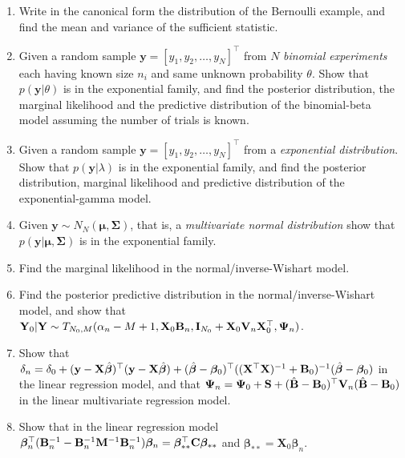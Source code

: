 \begin{enumerate}
	\item Write in the canonical form the distribution of the Bernoulli example, and find the mean and variance of the sufficient statistic.
	
	\item Given a random sample $\mathbf{y}=[y_1,y_2,\dots,y_N]^{\top}$ from $N$ \textit{binomial experiments} each having known size $n_i$ and same unknown probability $\theta$. Show that $p(\mathbf{y}|\theta)$ is in the exponential family, and find the posterior distribution, the marginal likelihood and the predictive distribution of the binomial-beta model assuming the number of trials is known.
	
	\item Given a random sample $\mathbf{y}=[y_1,y_2,\dots,y_N]^{\top}$ from a \textit{exponential distribution}. Show that $p(\mathbf{y}|\lambda)$ is in the exponential family, and find the posterior distribution, marginal likelihood and predictive distribution of the exponential-gamma model.
	
	\item Given $\mathbf{y}\sim N_N(\bm{\mu},\bm{\Sigma})$, that is, a \textit{multivariate normal distribution} show that $p(\mathbf{y}|\bm{\mu},\bm{\Sigma})$ is in the exponential family.
	
	\item Find the marginal likelihood in the normal/inverse-Wishart model.
	
	\item Find the posterior predictive distribution in the normal/inverse-Wishart model, and show that ${\bf{Y}}_0|{\bf{Y}}\sim T_{N_0,M}(\alpha_n-M+1,{\bf{X}}_0{\bf{B}}_n,{\bf{I}}_{N_0}+{\bf{X}}_0{\bf{V}}_n{\bf{X}}_0^{\top},{\bf{\Psi}}_n)$.
	
	\item Show that $\delta_n=\delta_0+({\bf{y}}-{\bf{X}}\hat{\bm{\beta}})^{\top}({\bf{y}}-{\bf{X}}\hat{\bm{\beta}})+(\hat{\bm{\beta}}-\bm{\beta}_0)^{\top}(({\bf{X}}^{\top}{\bf{X}})^{-1}+{\bf{B}}_0)^{-1}(\hat{\bm{\beta}}-\bm{\beta}_0)$ in the linear regression model, and that ${\bf{\Psi}}_{n}={\bf{\Psi}}_{0}+{\bf{S}}+(\hat{\bf{B}}-{\bf{B}}_{0})^{\top}{\bf{V}}_{n}(\hat{\bf{B}}-{\bf{B}}_{0})$ in the linear multivariate regression model. 
			
	\item Show that in the linear regression model $\bm{\beta}_n^{\top}({\bf{B}}_n^{-1}-{\bf{B}}_n^{-1}{\bf{M}}^{-1}{\bf{B}}_n^{-1})\bm{\beta}_n={\bf{\bm{\beta}}}_{**}^{\top}{\bf{C}}{\bf{\bm{\beta}}}_{**}$ and $\bm{\beta}_{**}={\mathbf{X}}_0\bm{\beta}_n$.
	

\end{enumerate}
